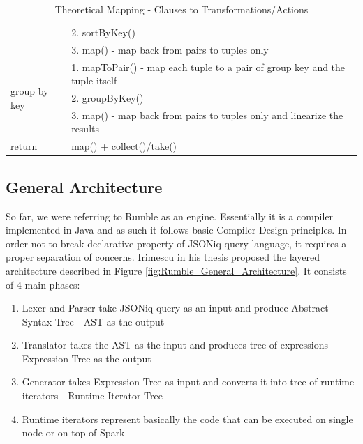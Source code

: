 \begin{table}[h!]
{\begin{tabular}{|l|l|}
			& 2. sortByKey()                                                                                                                                                                 \\ \cline{2-2} 
			& 3. map() - map back from pairs to tuples only                                                                                                                                  \\ \hline
			\multirow{3}{*}{group by key}                           & 1. mapToPair() - map each tuple to a pair of group key and the tuple itself                                                                                                    \\ \cline{2-2} 
			& 2. groupByKey()                                                                                                                                                                \\ \cline{2-2} 
			& 3. map() - map back from pairs to tuples only and linearize the results                                                                                                        \\ \hline
			return                                                  & map() + collect()/take()                                                                                                                                                       \\ \hline
		\end{tabular}%
	}
	\caption{Theoretical Mapping - Clauses to Transformations/Actions}
	\label{tab:ClausesMapping}
\end{table}

\subsection{General Architecture}
So far, we were referring to Rumble as an engine. Essentially it is a compiler implemented in Java and as such it follows basic Compiler Design principles. In order not to break declarative property of JSONiq query language, it requires a proper separation of concerns. Irimescu in his thesis \cite{RumbleThesis} proposed the layered architecture described in Figure \ref{fig:Rumble_General_Architecture}. It consists of 4 main phases:
\begin{enumerate}
	\item Lexer and Parser take JSONiq query as an input and produce Abstract Syntax Tree - AST as the output 
	\item Translator takes the AST as the input and produces tree of expressions - Expression Tree as the output
	\item Generator takes Expression Tree as input and converts it into tree of runtime iterators - Runtime Iterator Tree
	\item Runtime iterators represent basically the code that can be executed on single node or on top of Spark
\end{enumerate} 

